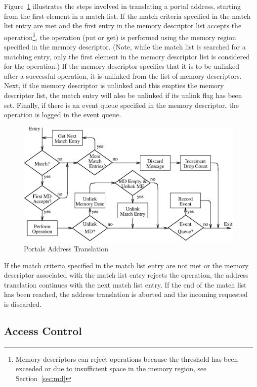 \documentclass{sand-report}
\begin{document}
Figure~\ref{fig:flow} illustrates the steps involved in translating a
portal address, starting from the first element in a match list.  If
the match criteria specified in the match list entry are met and the
first entry in the memory descriptor list accepts the
operation\footnote{Memory descriptors can reject operations because
the threshold has been exceeded or due to insufficient space in the
memory region, see Section~\ref{sec:md}}, the operation (put or get)
is performed using the memory region specified in the memory
descriptor.  (Note, while the match list is searched for a matching
entry, only the first element in the memory descriptor list is
considered for the operation.)  If the memory descriptor specifies
that it is to be unlinked after a successful operation, it is unlinked
from the list of memory descriptors.  Next, if the memory descriptor
is unlinked and this empties the memory descriptor list, the match
entry will also be unlinked if its unlink flag has been set.  Finally,
if there is an event queue specified in the memory descriptor, the
operation is logged in the event queue.

\begin{figure}[htbp]
\centerline{\includegraphics{flow.eps}}
\caption{Portals Address Translation}
\label{fig:flow}
\end{figure}

If the match criteria specified in the match list entry are not met or
the memory descriptor associated with the match list entry rejects the
operation, the address translation continues with the next match list
entry.  If the end of the match list has been reached, the address
translation is aborted and the incoming requested is discarded.

\subsection{Access Control}
\end{document}
